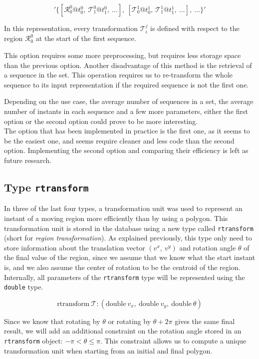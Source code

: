 \[
    '\{[\mathcal{R}_0^0@t_0^0,\ \mathcal{T}_1^0@t_1^0,\ ...],\ [\mathcal{T}_0^1@t_0^1,\ \mathcal{T}_1^1@t_1^1,\ ...],\ ...\}'
\]

In this representation, every transformation $\mathcal{T}_i^j$ is defined with respect to the region $\mathcal{R}_0^0$ at the start of the first sequence.

This option requires some more preprocessing, but requires less storage space than the previous option. Another disadvantage of this method is the retrieval of a sequence in the set. This operation requires us to re-transform the whole sequence to its input representation if the required sequence is not the first one.

Depending on the use case, the average number of sequences in a set, the average number of instants in each sequence and a few more parameters, either the first option or the second option could prove to be more interesting. \\

The option that has been implemented in practice is the first one, as it seems to be the easiest one, and seems require cleaner and less code than the second option. Implementing the second option and comparing their efficiency is left as future research.

\subsection{Type \texttt{rtransform}}

In three of the last four types, a transformation unit was used to represent an instant of a moving region more efficiently than by using a polygon. This transformation unit is stored in the database using a new type called \lstinline{rtransform} (short for \textit{region transformation}). As explained previously, this type only need to store information about the translation vector $(v^x,\ v^y)$ and rotation angle $\theta$ of the final value of the region, since we assume that we know what the start instant is, and we also assume the center of rotation to be the centroid of the region. Internally, all parameters of the \lstinline{rtransform} type will be represented using the \lstinline{double} type.

\[
    \text{rtransform}\ \mathcal{T}: (\text{double}\ v_x,\ \text{double}\ v_y,\ \text{double}\ \theta)
\]

Since we know that rotating by $\theta$ or rotating by $\theta + 2\pi$ gives the same final result, we will add an additional constraint on the rotation angle stored in an \lstinline{rtransform} object: $-\pi < \theta \le \pi$. This constraint allows us to compute a unique transformation unit when starting from an initial and final polygon. \\

